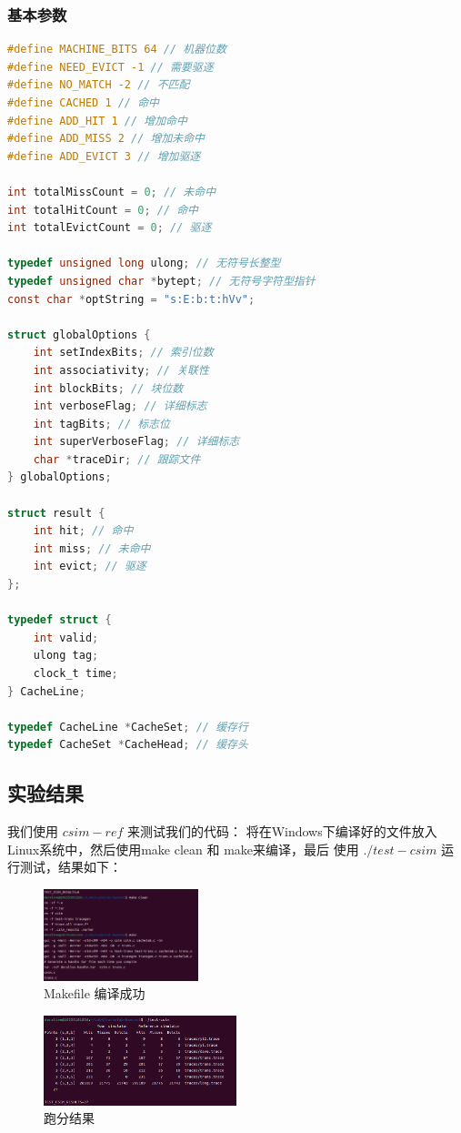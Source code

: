 \subsubsection{基本参数}
\begin{lstlisting}[language = C , title = {Parameter Definition} ]
#define MACHINE_BITS 64 // 机器位数
#define NEED_EVICT -1 // 需要驱逐
#define NO_MATCH -2 // 不匹配
#define CACHED 1 // 命中
#define ADD_HIT 1 // 增加命中
#define ADD_MISS 2 // 增加未命中
#define ADD_EVICT 3 // 增加驱逐

int totalMissCount = 0; // 未命中
int totalHitCount = 0; // 命中
int totalEvictCount = 0; // 驱逐

typedef unsigned long ulong; // 无符号长整型
typedef unsigned char *bytept; // 无符号字符型指针
const char *optString = "s:E:b:t:hVv"; 

struct globalOptions {
	int setIndexBits; // 索引位数
	int associativity; // 关联性
	int blockBits; // 块位数
	int verboseFlag; // 详细标志
	int tagBits; // 标志位
	int superVerboseFlag; // 详细标志
	char *traceDir; // 跟踪文件
} globalOptions;

struct result {
	int hit; // 命中
	int miss; // 未命中
	int evict; // 驱逐
};

typedef struct {
	int valid;
	ulong tag;
	clock_t time;
} CacheLine;

typedef CacheLine *CacheSet; // 缓存行
typedef CacheSet *CacheHead; // 缓存头
\end{lstlisting}

\subsection{实验结果}
我们使用 $ csim-ref $ 来测试我们的代码：
将在Windows下编译好的文件放入Linux系统中，然后使用make clean 和 make来编译，最后
使用 $./test-csim$ 运行测试，结果如下：

\begin{figure} [H]
    \centering
    \includegraphics[width=0.4\textwidth]{Make.png}
    \caption{Makefile 编译成功}
\end{figure}

\begin{figure} [H]
    \centering
    \includegraphics[width=0.5\textwidth]{csim.png}
    \caption{跑分结果}
\end{figure}